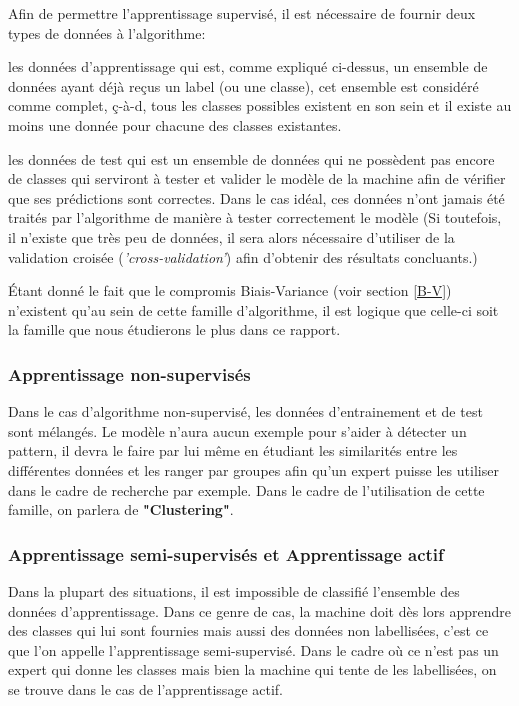 \documentclass[a4paper]{article}
\begin{document}
Afin de permettre l'apprentissage supervisé, il est nécessaire de fournir deux types de données à l'algorithme: 

les données d'apprentissage qui est, comme expliqué ci-dessus, un ensemble de données ayant déjà reçus un label (ou une classe), cet ensemble est considéré comme complet, ç-à-d, tous les classes possibles existent en son sein et il existe au moins une donnée pour chacune des classes existantes. 
\newline

les données de test qui est un ensemble de données qui ne possèdent pas encore de classes qui serviront à tester et valider le modèle de la machine afin de vérifier que ses prédictions sont correctes. Dans le cas idéal, ces données n'ont jamais été traités par l'algorithme de manière à tester correctement le modèle (Si toutefois, il n'existe que très peu de données, il sera alors nécessaire d'utiliser de la validation croisée (\textit{'cross-validation'}) afin d'obtenir des résultats concluants.)

Étant donné le fait que le compromis Biais-Variance (voir section \ref{B-V}) n'existent qu'au sein de cette famille d'algorithme, il est logique que celle-ci soit la famille que nous étudierons le plus dans ce rapport.

\subsubsection{Apprentissage non-supervisés}
Dans le cas d'algorithme non-supervisé, les données d'entrainement et de test sont mélangés. Le modèle n'aura aucun exemple pour s'aider à détecter un pattern, il devra le faire par lui même en étudiant les similarités entre les différentes données et les ranger par groupes afin qu'un expert puisse les utiliser dans le cadre de recherche par exemple. Dans le cadre de l'utilisation de cette famille, on parlera de \textbf{"Clustering"}. \newline

\subsubsection{Apprentissage semi-supervisés et Apprentissage actif}
Dans la plupart des situations, il est impossible de classifié l'ensemble des données d'apprentissage. Dans ce genre de cas, la machine doit dès lors apprendre des classes qui lui sont fournies mais aussi des données non labellisées, c'est ce que l'on appelle l'apprentissage semi-supervisé. Dans le cadre où ce n'est pas un expert qui donne les classes mais bien la machine qui tente de les labellisées, on se trouve dans le cas de l'apprentissage actif. 
\end{document}
